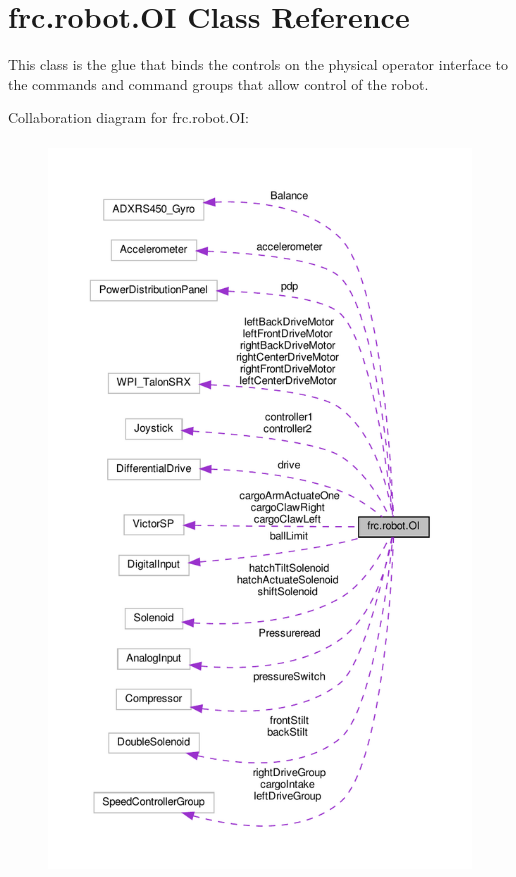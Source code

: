 \hypertarget{classfrc_1_1robot_1_1_o_i}{}\section{frc.\+robot.\+OI Class Reference}
\label{classfrc_1_1robot_1_1_o_i}


This class is the glue that binds the controls on the physical operator interface to the commands and command groups that allow control of the robot.  




Collaboration diagram for frc.\+robot.\+OI\+:\nopagebreak
\begin{figure}[H]
\begin{center}
\leavevmode
\includegraphics[height=550pt]{d4/dfa/classfrc_1_1robot_1_1_o_i__coll__graph}
\end{center}
\end{figure}
